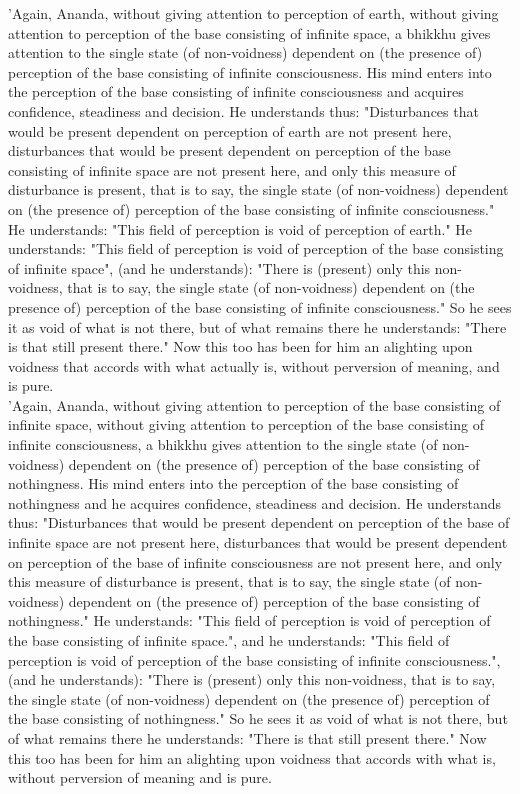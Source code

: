\documentclass[11pt]{article}
\begin{document}
 'Again, Ananda, without giving attention to perception of earth, without giving attention to perception of the base consisting of infinite space, a bhikkhu gives attention to the single state (of non-voidness) dependent on (the presence of) perception of the base consisting of infinite consciousness. His mind enters into the perception of the base consisting of infinite consciousness and acquires confidence, steadiness and decision. He understands thus: "Disturbances that would be present dependent on perception of earth are not present here, disturbances that would be present dependent on perception of the base consisting of infinite space are not present here, and only this measure of disturbance is present, that is to say, the single state (of non-voidness) dependent on (the presence of) perception of the base consisting of infinite consciousness." He understands: "This field of perception is void of perception of earth." He understands: "This field of perception is void of perception of the base consisting of infinite space", (and he understands): "There is (present) only this non-voidness, that is to say, the single state (of non-voidness) dependent on (the presence of) perception of the base consisting of infinite consciousness." So he sees it as void of what is not there, but of what remains there he understands: "There is that still present there." Now this too has been for him an alighting upon voidness that accords with what actually is, without perversion of meaning, and is pure.\\

 'Again, Ananda, without giving attention to perception of the base consisting of infinite space, without giving attention to perception of the base consisting of infinite consciousness, a bhikkhu gives attention to the single state (of non-voidness) dependent on (the presence of) perception of the base consisting of nothingness. His mind enters into the perception of the base consisting of nothingness and he acquires confidence, steadiness and decision. He understands thus: "Disturbances that would be present dependent on perception of the base of infinite space are not present here, disturbances that would be present dependent on perception of the base of infinite consciousness are not present here, and only this measure of disturbance is present, that is to say, the single state (of non-voidness) dependent on (the presence of) perception of the base consisting of nothingness." He understands: "This field of perception is void of perception of the base consisting of infinite space.", and he understands: "This field of perception is void of perception of the base consisting of infinite consciousness.", (and he understands): "There is (present) only this non-voidness, that is to say, the single state (of non-voidness) dependent on (the presence of) perception of the base consisting of nothingness." So he sees it as void of what is not there, but of what remains there he understands: "There is that still present there." Now this too has been for him an alighting upon voidness that accords with what is, without perversion of meaning and is pure.\\
\end{document}
